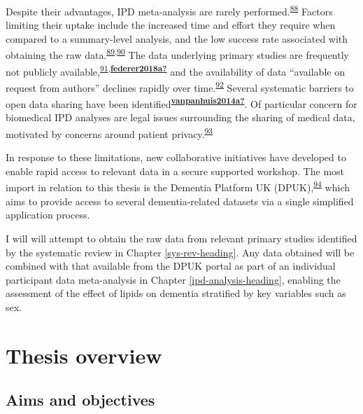 \documentclass[a4paper, twoside]{templates/ociamthesis}
\begin{document}
Despite their advantages, IPD meta-analysis are rarely performed.\textsuperscript{\protect\hyperlink{ref-tugwell2010}{88}} Factors limiting their uptake include the increased time and effort they require when compared to a summary-level analysis, and the low success rate associated with obtaining the raw data.\textsuperscript{\protect\hyperlink{ref-nevitt2017a}{89},\protect\hyperlink{ref-ventresca2020}{90}} The data underlying primary studies are frequently not publicly available,\textsuperscript{\protect\hyperlink{ref-alsheikh-ali2011}{91},\protect\hyperlink{ref-federer2018a}{\textbf{federer2018a?}}} and the availability of data ``available on request from authors'' declines rapidly over time.\textsuperscript{\protect\hyperlink{ref-vines2014}{92}} Several systematic barriers to open data sharing have been identified\textsuperscript{\protect\hyperlink{ref-vanpanhuis2014a}{\textbf{vanpanhuis2014a?}}}. Of particular concern for biomedical IPD analyses are legal issues surrounding the sharing of medical data, motivated by concerns around patient privacy.\textsuperscript{\protect\hyperlink{ref-wartenberg2010}{93}}

In response to these limitations, new collaborative initiatives have developed to enable rapid access to relevant data in a secure supported workshop. The most import in relation to this thesis is the Dementia Platform UK (DPUK),\textsuperscript{\protect\hyperlink{ref-bauermeister2020}{94}} which aims to provide access to several dementia-related datasets via a single simplified application process.

I will will attempt to obtain the raw data from relevant primary studies identified by the systematic review in Chapter \ref{sys-rev-heading}. Any data obtained will be combined with that available from the DPUK portal as part of an individual participant data meta-analysis in Chapter \ref{ipd-analysis-heading}, enabling the assessment of the effect of lipids on dementia stratified by key variables such as sex.

\hypertarget{thesis-overview}{%
\section{Thesis overview}\label{thesis-overview}}

\hypertarget{aims-and-objectives}{%
\subsection{Aims and objectives}\label{aims-and-objectives}}
\end{document}
